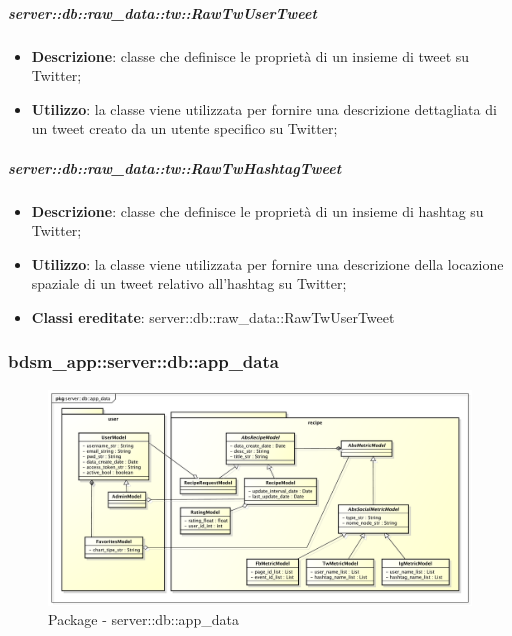 		\subparagraph{server::db::raw\_data::tw::RawTwUserTweet} %
		\label{subp:server_db_raw_data_tw_rawtwusertweet}
			\begin{itemize}
				\item \textbf{Descrizione}: classe che definisce le proprietà di un insieme di tweet su Twitter;
				\item \textbf{Utilizzo}: la classe viene utilizzata per fornire una descrizione dettagliata di un tweet creato da un utente specifico su Twitter;
			\end{itemize}


		\subparagraph{server::db::raw\_data::tw::RawTwHashtagTweet} %
		\label{subp:server_db_raw_data_tw_rawtwhashtagtweet}
			\begin{itemize}
				\item \textbf{Descrizione}: classe che definisce le proprietà di un insieme di hashtag su Twitter;
				\item \textbf{Utilizzo}: la classe viene utilizzata per fornire una descrizione della locazione spaziale di un tweet relativo all'hashtag su Twitter;
				\item \textbf{Classi ereditate}: server::db::raw\_data::RawTwUserTweet
			\end{itemize}





\subsubsection{bdsm\_app::server::db::app\_data} %
\label{ssub:bdsm_app_server_app_data}


	\begin{figure}[htbp]
		\centering
		\centerline{\includegraphics[scale=0.38]{./images/server/app_data.pdf}}
		\caption{Package - server::db::app\_data}
	\end{figure}


